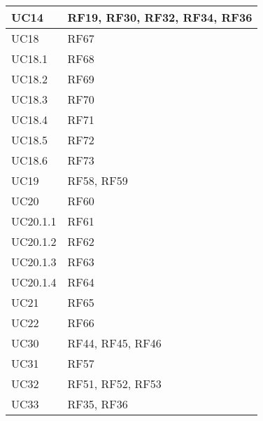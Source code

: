 \begin{center}
\begin{longtable}{|C{5cm}|C{5cm}|}
        \hline
        UC14 & RF19, RF30, RF32, RF34, RF36 \\
        \hline
        UC18 & RF67 \\
        \hline
        UC18.1 & RF68 \\
        \hline
        UC18.2 & RF69 \\
        \hline
        UC18.3 & RF70 \\
        \hline
        UC18.4 & RF71 \\
        \hline
        UC18.5 & RF72 \\
        \hline
        UC18.6 & RF73 \\
        \hline
        UC19 & RF58, RF59 \\
        \hline
        UC20 & RF60 \\
        \hline
        UC20.1.1 & RF61 \\
        \hline
        UC20.1.2 & RF62 \\
        \hline
        UC20.1.3 & RF63 \\
        \hline
        UC20.1.4 & RF64 \\
        \hline
        UC21 & RF65 \\
        \hline
        UC22 & RF66 \\
        \hline
        UC30 & RF44, RF45, RF46 \\
        \hline
        UC31 & RF57 \\
        \hline
        UC32 & RF51, RF52, RF53 \\
        \hline
        UC33 & RF35, RF36 \\
        \hline
    \end{longtable}
\end{center}
